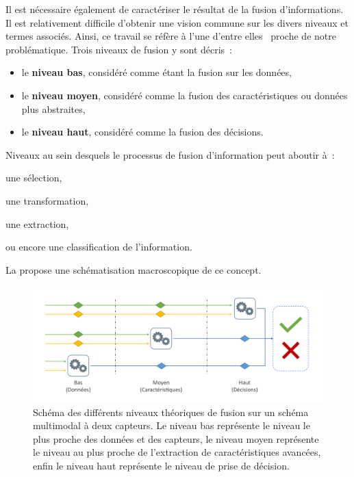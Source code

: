 Il est nécessaire également de caractériser le résultat de la fusion d'informations. Il est relativement difficile d'obtenir une vision commune sur les divers niveaux et termes associés. Ainsi, ce travail se réfère à l'une d'entre elles~\cite{Dasarathy1997} proche de notre problématique. Trois niveaux de fusion y sont décris~:
\begin{itemize}
    \item le \textbf{niveau bas}, considéré comme étant la fusion sur les données,
    \item le \textbf{niveau moyen}, considéré comme la fusion des caractéristiques ou données plus abstraites,
    \item le \textbf{niveau haut}, considéré comme la fusion des décisions.
\end{itemize} Niveaux au sein desquels le processus de fusion d'information peut aboutir à~:
\begin{inlinerate}
    \item une sélection,
    \item une transformation,
    \item une extraction,
    \item ou encore une classification de l'information.
\end{inlinerate} La  propose une schématisation macroscopique de ce concept.\par
 
\begin{figure}[H]
    \centering
    \includegraphics[width=\linewidth]{contents/chapter_3/resources/scheme_overview_fusion.pdf}
    \caption{Schéma des différents niveaux théoriques de fusion sur un schéma multimodal à deux capteurs. Le niveau bas représente le niveau le plus proche des données et des capteurs, le niveau moyen représente le niveau au plus proche de l'extraction de caractéristiques avancées, enfin le niveau haut représente le niveau de prise de décision.}
    \label{fig:scheme_overview_fusion}
\end{figure}\par


